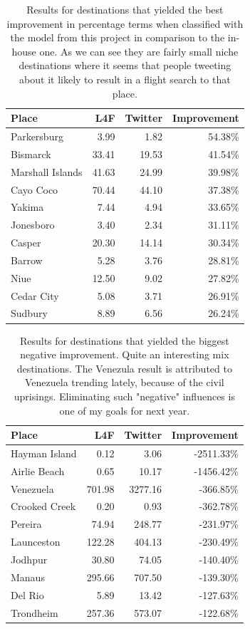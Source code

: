 \documentclass[minf,frontabs,twoside,singlespacing,parskip]{infthesis}
\begin{document}
\begin{table}[]
\begin{center}
\begin{tabular}{ l | r | r | r}
Place & L4F & Twitter & Improvement \\
\hline
Parkersburg & 3.99 & 1.82 & 54.38\% \\
Bismarck & 33.41 & 19.53 & 41.54\% \\
Marshall Islands & 41.63 & 24.99 & 39.98\% \\
Cayo Coco & 70.44 & 44.10 & 37.38\% \\
Yakima & 7.44 & 4.94 & 33.65\% \\
Jonesboro & 3.40 & 2.34 & 31.11\% \\
Casper & 20.30 & 14.14 & 30.34\% \\
Barrow & 5.28 & 3.76 & 28.81\% \\
Niue & 12.50 & 9.02 & 27.82\% \\
Cedar City & 5.08 & 3.71 & 26.91\% \\
Sudbury & 8.89 & 6.56 & 26.24\% \\
\end{tabular}
\end{center}
\caption{Results for destinations that yielded the best improvement in percentage terms when classified with the model from this project in comparison to the in-house one. As we can see they are fairly small niche destinations where it seems that people tweeting about it likely to result in a flight search to that place.}
\label{4-1}
\end{table}

\begin{table}[]
\begin{center}
\begin{tabular}{ l | r | r | r}
Place & L4F & Twitter & Improvement \\
\hline
Hayman Island & 0.12 & 3.06 & -2511.33\% \\
Airlie Beach & 0.65 & 10.17 & -1456.42\% \\
Venezuela & 701.98 & 3277.16 & -366.85\% \\
Crooked Creek & 0.20 & 0.93 & -362.78\% \\
Pereira & 74.94 & 248.77 & -231.97\% \\
Launceston & 122.28 & 404.13 & -230.49\% \\
Jodhpur & 30.80 & 74.05 & -140.40\% \\
Manaus & 295.66 & 707.50 & -139.30\% \\
Del Rio & 5.89 & 13.42 & -127.63\% \\
Trondheim & 257.36 & 573.07 & -122.68\%
\end{tabular}
\end{center}
\caption{Results for destinations that yielded the biggest negative improvement. Quite an interesting mix destinations. The Venezula result is attributed to Venezuela trending lately, because of the civil uprisings. Eliminating such "negative" influences is one of my goals for next year.}
\label{4-2}
\end{table}
\end{document}
